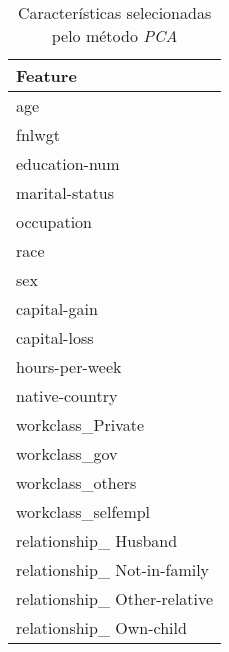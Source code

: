 \begin{table}
\centering
\caption{Características selecionadas pelo método \textit{PCA}}
\begin{tabular}{l}
\toprule
                      Feature \\
\midrule
                          age \\
                       fnlwgt \\
                education-num \\
               marital-status \\
                   occupation \\
                         race \\
                          sex \\
                 capital-gain \\
                 capital-loss \\
               hours-per-week \\
               native-country \\
            workclass\_Private \\
                workclass\_gov \\
             workclass\_others \\
           workclass\_selfempl \\
        relationship\_ Husband \\
  relationship\_ Not-in-family \\
 relationship\_ Other-relative \\
      relationship\_ Own-child \\
\bottomrule
\end{tabular}
\end{table}
